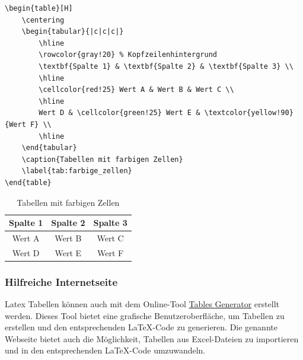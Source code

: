 \begin{minipage}{0.69\textwidth}
    \begin{lstlisting}[language={[LaTeX]TeX}, basicstyle=\small\ttfamily]
\begin{table}[H]
    \centering
    \begin{tabular}{|c|c|c|}
        \hline
        \rowcolor{gray!20} % Kopfzeilenhintergrund
        \textbf{Spalte 1} & \textbf{Spalte 2} & \textbf{Spalte 3} \\
        \hline
        \cellcolor{red!25} Wert A & Wert B & Wert C \\
        \hline
        Wert D & \cellcolor{green!25} Wert E & \textcolor{yellow!90}{Wert F} \\
        \hline
    \end{tabular}
    \caption{Tabellen mit farbigen Zellen}
    \label{tab:farbige_zellen}
\end{table}
    \end{lstlisting}
\end{minipage}
\hfill
\begin{minipage}{0.29\textwidth}
    \begin{table}[H]
        \centering
        \begin{tabular}{|c|c|c|}
            \hline
            \rowcolor{gray!20} %
            \textbf{Spalte 1}         & \textbf{Spalte 2}           & \textbf{Spalte 3}             \\
            \hline
            \cellcolor{red!25} Wert A & Wert B                      & Wert C                        \\
            \hline
            Wert D                    & \cellcolor{green!25} Wert E & \textcolor{yellow!90}{Wert F} \\
            \hline
        \end{tabular}
        \caption{Tabellen mit farbigen Zellen}
        \label{tab:farbige_zellen}
    \end{table}
\end{minipage}


\subsubsection{Hilfreiche Internetseite}
Latex Tabellen können auch mit dem Online-Tool \href{https://tablesgenerator.com/latex_tables}{Tables Generator} erstellt werden. Dieses Tool bietet eine grafische Benutzeroberfläche, um Tabellen zu erstellen und den entsprechenden \LaTeX-Code zu generieren. Die genannte Webseite bietet auch die Möglichkeit, Tabellen aus Excel-Dateien zu importieren und in den entsprechenden \LaTeX-Code umzuwandeln.

